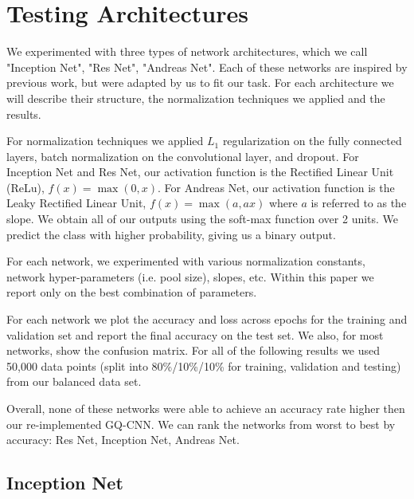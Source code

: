 
\section{Testing Architectures}
\label{sec:archs}

We experimented with three types of network architectures, which we call "Inception Net", "Res Net", "Andreas Net". 
Each of these networks are inspired by previous work, but were adapted by us to fit our task. 
For each architecture we will describe their structure, the normalization techniques we applied and the results. 
 
For normalization techniques we applied $L_{1}$ regularization on the fully connected layers, batch normalization on the convolutional layer, and dropout. 
For Inception Net and Res Net, our activation function is the Rectified Linear Unit (ReLu), $f(x) = \max(0, x)$. 
For Andreas Net, our activation function is the Leaky Rectified Linear Unit, $f(x) = \max(a, ax)$ where $a$ is referred to as the slope. 
We obtain all of our outputs using the soft-max function over 2 units. 
We predict the class with higher probability, giving us a binary output. 

For each network, we experimented with various normalization constants, network hyper-parameters (i.e. pool size), slopes, etc. 
Within this paper we report only on the best combination of parameters. 

For each network we plot the accuracy and loss across epochs for the training and validation set and report the final accuracy on the test set. 
We also, for most networks, show the confusion matrix.
For all of the following results we used 50,000 data points (split into 80\%/10\%/10\% for training, validation and testing) from our balanced data set. 

Overall, none of these networks were able to achieve an accuracy rate higher then our re-implemented GQ-CNN. 
We can rank the networks from worst to best by accuracy: Res Net, Inception Net, Andreas Net. 

\subsection{Inception Net}


